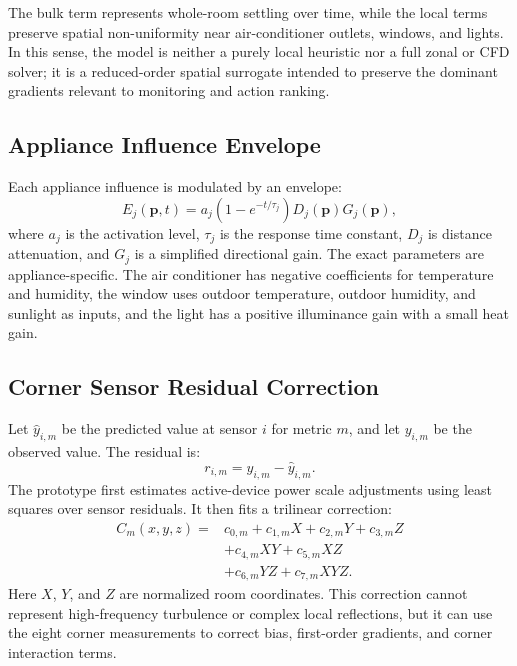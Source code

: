 \documentclass[conference]{IEEEtran}
\begin{document}
The bulk term represents whole-room settling over time, while the local terms preserve spatial non-uniformity near air-conditioner outlets, windows, and lights. In this sense, the model is neither a purely local heuristic nor a full zonal or CFD solver; it is a reduced-order spatial surrogate intended to preserve the dominant gradients relevant to monitoring and action ranking.

\subsection{Appliance Influence Envelope}
Each appliance influence is modulated by an envelope:
\begin{equation}
E_j(\mathbf{p},t)=a_j(1-e^{-t/\tau_j})D_j(\mathbf{p})G_j(\mathbf{p}),
\end{equation}
where $a_j$ is the activation level, $\tau_j$ is the response time constant, $D_j$ is distance attenuation, and $G_j$ is a simplified directional gain. The exact parameters are appliance-specific. The air conditioner has negative coefficients for temperature and humidity, the window uses outdoor temperature, outdoor humidity, and sunlight as inputs, and the light has a positive illuminance gain with a small heat gain.

\subsection{Corner Sensor Residual Correction}
Let $\hat{y}_{i,m}$ be the predicted value at sensor $i$ for metric $m$, and let $y_{i,m}$ be the observed value. The residual is:
\begin{equation}
r_{i,m}=y_{i,m}-\hat{y}_{i,m}.
\end{equation}
The prototype first estimates active-device power scale adjustments using least squares over sensor residuals. It then fits a trilinear correction:
\begin{align}
C_m(x,y,z)={}&c_{0,m}+c_{1,m}X+c_{2,m}Y+c_{3,m}Z \nonumber\\
&+c_{4,m}XY+c_{5,m}XZ \nonumber\\
&+c_{6,m}YZ+c_{7,m}XYZ .
\end{align}
Here $X$, $Y$, and $Z$ are normalized room coordinates. This correction cannot represent high-frequency turbulence or complex local reflections, but it can use the eight corner measurements to correct bias, first-order gradients, and corner interaction terms.
\end{document}
